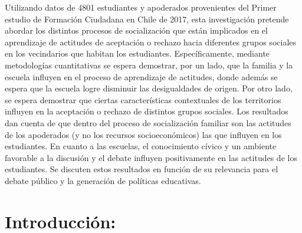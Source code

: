 \documentclass[12pt,twoside]{templates/facsothesis}
\begin{document}
Utilizando datos de 4801 estudiantes y apoderados provenientes del Primer estudio de Formación Ciudadana en Chile de 2017, esta investigación pretende abordar los distintos procesos de socialización que están implicados en el aprendizaje de actitudes de aceptación o rechazo hacia diferentes grupos sociales en los vecindarios que habitan los estudiantes. Específicamente, mediante metodologías cuantitativas se espera demostrar, por un lado, que la familia y la escuela influyen en el proceso de aprendizaje de actitudes, donde además se espera que la escuela logre disminuir las desigualdades de origen. Por otro lado, se espera demostrar que ciertas características contextuales de los territorios influyen en la aceptación o rechazo de distintos grupos sociales. Los resultados dan cuenta de que dentro del proceso de socialización familiar son las actitudes de los apoderados (y no los recursos socioeconómicos) las que influyen en los estudiantes. En cuanto a las escuelas, el conocimiento cívico y un ambiente favorable a la discusión y el debate influyen positivamente en las actitudes de los estudiantes. Se discuten estos resultados en función de su relevancia para el debate público y la generación de políticas educativas.

\hypertarget{introducciuxf3n}{%
\chapter{Introducción:}\label{introducciuxf3n}}
\end{document}
